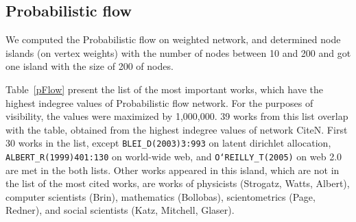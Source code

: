 \documentclass[11pt]{article} %
\begin{document}


\subsection{Probabilistic flow}

We computed the Probabilistic flow on weighted network, and determined node islands (on vertex weights) with the number of nodes between 10 and 200 and got one island with the size of 200 of nodes.

Table~\ref{pFlow} present the list of the  most important works, which have the highest indegree values of Probabilistic flow network. For the purposes of visibility, the values were maximized by 1,000,000. 39 works from this list overlap with the table, obtained from the highest indegree values of network CiteN. First 30 works in the list, except \texttt{BLEI\_D(2003)3:993} on  latent dirichlet allocation, \texttt{ALBERT\_R(1999)401:130} on world-wide web, and \texttt{O`REILLY\_T(2005)} on web 2.0 are met in the both lists. Other works appeared in this island, which are not in the list of the most cited works, are works of physicists (Strogatz, Watts, Albert), computer scientists (Brin), mathematics (Bollobas), scientometrics (Page, Redner), and social scientists (Katz, Mitchell, Glaser). 
\end{document}
